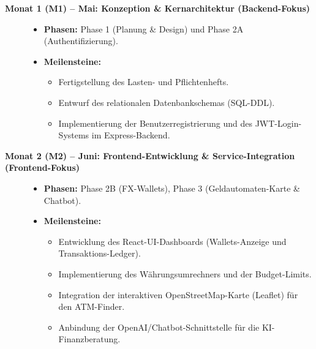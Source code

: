 \documentclass[11pt,a4paper]{article}
\begin{document}
\begin{description}
    \item[\textbf{Monat 1 (M1) -- Mai: Konzeption \& Kernarchitektur (Backend-Fokus)}]
    \begin{itemize}
        \item \textbf{Phasen:} Phase 1 (Planung \& Design) und Phase 2A (Authentifizierung).
        \item \textbf{Meilensteine:}
        \begin{itemize}
            \item Fertigstellung des Lasten- und Pflichtenhefts.
            \item Entwurf des relationalen Datenbankschemas (SQL-DDL).
            \item Implementierung der Benutzerregistrierung und des JWT-Login-Systems im Express-Backend.
        \end{itemize}
    \end{itemize}
    
    \item[\textbf{Monat 2 (M2) -- Juni: Frontend-Entwicklung \& Service-Integration (Frontend-Fokus)}]
    \begin{itemize}
        \item \textbf{Phasen:} Phase 2B (FX-Wallets), Phase 3 (Geldautomaten-Karte \& Chatbot).
        \item \textbf{Meilensteine:}
        \begin{itemize}
            \item Entwicklung des React-UI-Dashboards (Wallets-Anzeige und Transaktions-Ledger).
            \item Implementierung des Währungsumrechners und der Budget-Limits.
            \item Integration der interaktiven OpenStreetMap-Karte (Leaflet) für den ATM-Finder.
            \item Anbindung der OpenAI/Chatbot-Schnittstelle für die KI-Finanzberatung.
        \end{itemize}
    \end{itemize}
    

\end{description}
\end{document}
